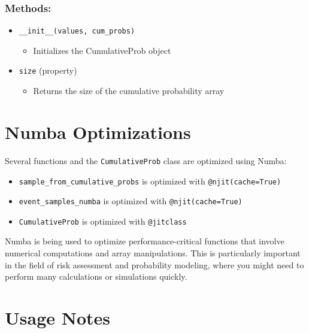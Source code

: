 \documentclass{article}
\begin{document}
\subsubsection{Methods:}
\begin{itemize}
    \item \texttt{\_\_init\_\_(values, cum\_probs)}
    \begin{itemize}
        \item Initializes the CumulativeProb object
    \end{itemize}
    \item \texttt{size} (property)
    \begin{itemize}
        \item Returns the size of the cumulative probability array
    \end{itemize}
\end{itemize}

\section{Numba Optimizations}

Several functions and the \texttt{CumulativeProb} class are optimized using Numba:

\begin{itemize}
    \item \texttt{sample\_from\_cumulative\_probs} is optimized with \texttt{@njit(cache=True)}
    \item \texttt{event\_samples\_numba} is optimized with \texttt{@njit(cache=True)}
    \item \texttt{CumulativeProb} is optimized with \texttt{@jitclass}
\end{itemize}

Numba is being used to optimize performance-critical functions that involve numerical computations and array manipulations. This is particularly important in the field of risk assessment and probability modeling, where you might need to perform many calculations or simulations quickly.

\section{Usage Notes}
\end{document}
